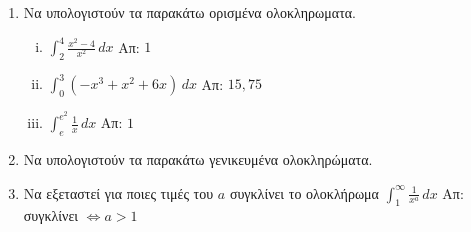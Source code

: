 \begin{enumerate}
  \item Να υπολογιστούν τα παρακάτω ορισμένα ολοκληρωματα.
    \begin{enumerate}[i)]
      \item $ \int _{2}^{4} \frac{x^{2}-4}{x^{2}} \,{dx} $ \hfill Απ: $ 1 $
      \item $ \int _{0}^{3} \left(-x^{3}+x^{2}+6x\right) \,{dx} $ 
        \hfill Απ: $ 15,75 $ 
      \item $ \int _{e}^{e^{2}} \frac{1}{x}  \,{dx} $ \hfill Απ: $ 1 $ 
    \end{enumerate}

  \item Να υπολογιστούν τα παρακάτω γενικευμένα ολοκληρώματα.


  \item Να εξεταστεί για ποιες τιμές του $ a $ συγκλίνει το ολοκλήρωμα 
    $ \int _{1}^{\infty} \frac{1}{x^{a}} \,{dx} $ 
    \hfill Απ: συγκλίνει $ \Leftrightarrow a > 1 $ 
\end{enumerate}


